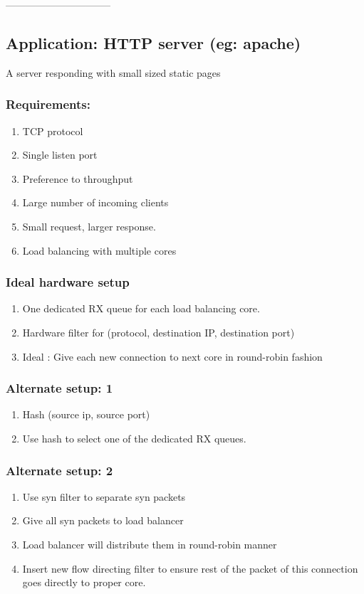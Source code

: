 --------------------------------
\subsection{Application:  HTTP server (eg: apache)}
A server responding with small sized static pages
\subsubsection{Requirements:}
\begin{enumerate}
    \item TCP protocol
    \item Single listen port
    \item Preference to throughput
    \item Large number of incoming clients
    \item Small request, larger response.
    \item Load balancing with multiple cores
\end{enumerate}

\subsubsection{Ideal hardware setup}
\begin{enumerate}
    \item One dedicated RX queue for each load balancing core.
    \item Hardware filter for (protocol, destination IP, destination port)
    \item Ideal : Give each new connection to next core in round-robin fashion
\end{enumerate}

\subsubsection{Alternate setup: 1}
\begin{enumerate}
       \item Hash (source ip, source port)
       \item Use hash to select one of the dedicated RX queues.
\end{enumerate}

\subsubsection{Alternate setup: 2}
\begin{enumerate}
       \item Use syn filter to separate syn packets
       \item Give all syn packets to load balancer
       \item Load balancer will distribute them in round-robin manner
       \item Insert new flow directing filter to ensure rest of the packet of
        this connection goes directly to proper core.
\end{enumerate}


